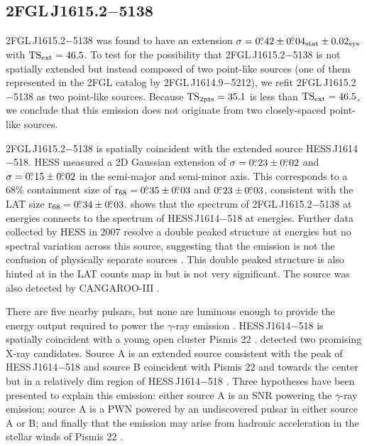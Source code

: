 \subsection{2FGL\,J1615.2$-$5138}

2FGL\,J1615.2$-$5138 was found
 to have an extension $\sigma=0\mbox{$.\!\!^\circ$}42\pm0\mbox{$.\!\!^\circ$}04_\text{stat}\pm0.02_\text{sys}$
with $\mathrm{TS}_\mathrm{ext}=46.5$.  To test for the possibility that 2FGL\,J1615.2$-$5138
is not spatially extended but instead composed of two point-like sources
(one of them represented in the 2FGL catalog by 2FGL\,J1614.9$-$5212),
we refit 2FGL\,J1615.2$-$5138 as two point-like sources.  Because
$\mathrm{TS}_{\mathrm{2pts}}=35.1$ is less than $\mathrm{TS}_\mathrm{ext}=46.5$, we conclude that this emission
does not originate from two closely-spaced point-like sources.

2FGL\,J1615.2$-$5138 is spatially coincident with the extended \tev
source HESS\,J1614$-$518.  \ac{HESS} measured a 2D Gaussian extension
of $\sigma=0\mbox{$.\!\!^\circ$}23\pm0\mbox{$.\!\!^\circ$}02$ and $\sigma=0\mbox{$.\!\!^\circ$}15\pm0\mbox{$.\!\!^\circ$}02$ in the
semi-major and semi-minor axis. This corresponds to a 68\% containment
size of ${\mathrm{r}_{68}}=0\mbox{$.\!\!^\circ$}35\pm0\mbox{$.\!\!^\circ$}03$ and $0\mbox{$.\!\!^\circ$}23\pm0\mbox{$.\!\!^\circ$}03$,
consistent with the LAT size ${\mathrm{r}_{68}}=0\mbox{$.\!\!^\circ$}34\pm0\mbox{$.\!\!^\circ$}03$.
 shows that the spectrum of 2FGL\,J1615.2$-$5138
at \gev energies connects to the spectrum of HESS\,J1614$-$518 at
\tev energies.  Further data collected by \ac{HESS} in 2007 resolve
a double peaked structure at \tev energies but no spectral variation
across this source, suggesting that the emission is not the confusion of
physically separate sources \citep{rowell_2008a_closer-unidentified}.
This double peaked structure is also hinted at in the LAT
counts map in  but is not very
significant.  The \tev source was also detected by CANGAROO-III
\citep{mizukami_2011a_cangaroo-iii-observation}.

There are five nearby pulsars, but none are luminous enough to provide
the energy output required to power the $\gamma$-ray emission
\citep{rowell_2008a_closer-unidentified}.  HESS\,J1614$-$518
is spatially coincident with a young open cluster Pismis 22
\citep{landi_2007a_j1614-518:-detection,rowell_2008a_closer-unidentified}.
\suzaku detected two promising X-ray candidates. Source A is an extended
source consistent with the peak of HESS\,J1614$-$518 and source B
coincident with Pismis 22 and towards the center but in a relatively dim
region of HESS\,J1614$-$518 \citep{matsumoto_2008a_discovery-extended}.
Three hypotheses have been presented to explain this emission: either
source A is an SNR powering the $\gamma$-ray emission; source A is a PWN
powered by an undiscovered pulsar in either source A or B; and finally
that the emission may arise from hadronic acceleration in the stellar
winds of Pismis 22 \citep{mizukami_2011a_cangaroo-iii-observation}.

